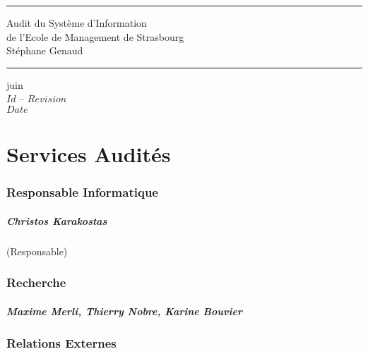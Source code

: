 \documentclass{book}
\begin{document}
\newcommand{\motcle}[1]{\index{#1}\emph{#1}}
\newcommand{\instrcle}[1]{\index{\texttt{#1}}\texttt{#1}}

\thispagestyle{empty}
\rhead[]{}
\pagestyle{fancy}
\setlength{\parindent}{0mm}
\setlength{\parskip}{0mm}
\rule{\linewidth}{1mm}
\begin{center}
\Large{Audit du Système d'Information}\\[5mm]
\Large{de l'Ecole de Management de Strasbourg}\\[5mm]
\large{Stéphane Genaud}
\rule{\linewidth}{1mm}
\end{center}
\begin{center}
juin  \\
$Id$ -- $Revision$\\
$Date$\\
\end{center}

\tableofcontents
\newpage

 
 

\chapter{Services Audités}
 

\subsection{Responsable Informatique}

\paragraph{Christos Karakostas} (Responsable)


\subsection{Recherche}
\paragraph{Maxime Merli, Thierry Nobre, Karine Bouvier}

\subsection{Relations Externes}
\end{document}
